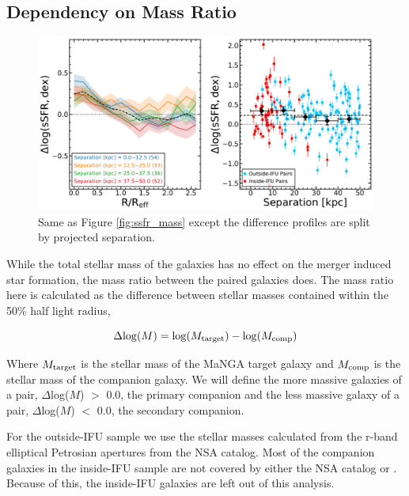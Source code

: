 \documentclass[iop,revtex4,twocolumn,apj,numberedappendix,appendixfloats]{emulateapj}
\begin{document}
\subsection{Dependency on Mass Ratio}\label{sec:dm}

\begin{figure}
\centering
\includegraphics[width=\linewidth]{fig/ssfr_sep.pdf}
\caption[]{Same as Figure \ref{fig:ssfr_mass} except the difference profiles are split by projected separation. }
\label{fig:ssfr_sep}
\end{figure}



While the total stellar mass of the galaxies has no effect on the merger induced star formation, the mass ratio between the paired galaxies does. The mass ratio here is calculated as the difference between stellar masses contained within the 50\% half light radius, 

\begin{equation}
\Delta {\rm log}(M) = {\rm log}(M_{\rm target}) - {\rm log}(M_{\rm comp}) 
\end{equation}

Where $M_{\rm target}$ is the stellar mass of the MaNGA target galaxy and $M_{\rm comp}$ is the stellar mass of the companion galaxy. We will define the more massive galaxies of a pair, $\Delta$log($M$) $>$ 0.0, the primary companion and the less massive galaxy of a pair, $\Delta$log($M$) $<$ 0.0, the secondary companion.

For the outside-IFU sample we use the stellar masses calculated from the r-band elliptical Petrosian apertures from the NSA catalog. Most of the companion galaxies in the inside-IFU sample are not covered by either the NSA catalog or \citet{Simard:2011}. Because of this, the inside-IFU galaxies are left out of this analysis.
\end{document}
